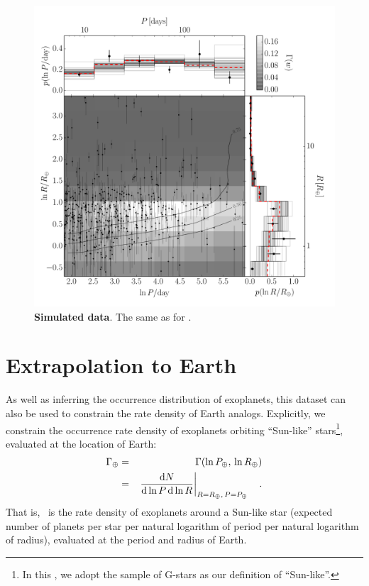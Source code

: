 \begin{figure}[p]
\begin{center}
\includegraphics[width=\textwidth]{figures/exopop/simulation/results.pdf}
\end{center}
\caption{%
{\bf Simulated data}.
The same as  for \modelb.
}
\end{figure}

\section{Extrapolation to Earth}

As well as inferring the occurrence distribution of exoplanets, this dataset
can also be used to constrain the rate density of Earth analogs.
Explicitly, we constrain the occurrence rate density of exoplanets orbiting
``Sun-like'' stars\footnote{In this \paper, we adopt the \citet{Petigura:2013}
sample of G-stars as our definition of ``Sun-like''.}, evaluated at the
location of Earth:
\begin{eqnarray}\eqlabel{gammaearth}
\gammaearth &=& \rate (\ln\period_\oplus,\,\ln\radius_\oplus) \\
&=&
\left.\frac{\dd N}{\dd\ln\period\,\dd\ln\radius}\right|
_{\radius=\radius_\oplus,\,\period=\period_\oplus}\quad.
\end{eqnarray}
That is, \gammaearth\ is the rate density of exoplanets around a Sun-like
star (expected number of planets per star per natural logarithm of period per
natural logarithm of radius), evaluated at the period and radius of Earth.

